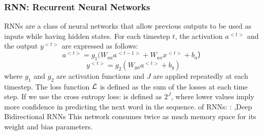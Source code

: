 \documentclass[10pt]{report}
\begin{document}
\subsubsection{RNN: Recurrent Neural Networks}
RNNs are a class of neural networks that allow previous outputs to be used as inputs while having hidden states. For each timestep $t$, the activation $a^{<t>}$ and the output $y^{<t>}$ are expressed as follows:
\[a^{<t>}=g_{1}(W_{aa}a^{<t-1>}+W_{ax}x^{<t>}+b_{a}）\]
\[y^{<t>}=g_2(W_{ya}a^{<t>}+b_y)\]
where $g_1$ and $g_2$ are activation functions and $J$ are applied repeatedly at each timestep. The loss function $\mathcal{L}$ is defined as the sum of the losses at each time step. If we use the cross entropy loss:
 is defined as $2^J$, where lower values imply more confidence in predicting the next
word in the sequence.  of RNNs:
:
\sep{Deep Bidirectional RNNs}
This network consumes twice as much memory space for its weight and bias parameters. 
\end{document}
